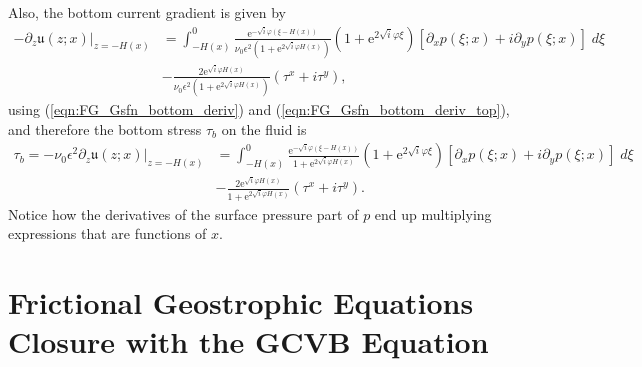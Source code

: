 \documentclass[10pt]{amsart}
\begin{document}
Also, the bottom current gradient is given by
\begin{align}
-\partial_z \left. \mathfrak{u} (z;x) \right|_{z = -H(x)} & =  \int_{-H(x)}^{0} 
 \frac{ \mathrm{e}^{-\sqrt{i} \varphi (\xi - H(x))  } }{ \nu_0 \epsilon^2 \left(1 + \mathrm{e}^{2 \sqrt{i} \varphi H \left(x \right)} \right)}
\left( 1 + \mathrm{e}^{2 \sqrt{i} \varphi \xi}\right) 
 \left[ \partial_x p( \xi; x) + i \partial_y p( \xi; x) \right] \; d \xi \nonumber \\
& - \frac{ 2 \mathrm{e}^{\sqrt{i} \varphi H(x)  } }{ \nu_0 \epsilon^2 \left(1 + \mathrm{e}^{2 \sqrt{i} \varphi H \left(x \right)} \right)}
\left( \tau^x + i \tau^y \right) ,
\end{align}
using (\ref{eqn:FG_Gsfn_bottom_deriv}) and (\ref{eqn:FG_Gsfn_bottom_deriv_top}), and therefore the bottom stress $\tau_b$ on the fluid is
\begin{align}
\tau_b = - \nu_0 \epsilon^2 \partial_z \left. \mathfrak{u} (z;x) \right|_{z = -H(x)} & = \int_{-H(x)}^{0} 
\frac{ \mathrm{e}^{-\sqrt{i} \varphi (\xi - H(x))  } }{ 1 + \mathrm{e}^{2 \sqrt{i} \varphi H \left(x \right)} }
\left( 1 + \mathrm{e}^{2 \sqrt{i} \varphi \xi}\right) 
 \left[ \partial_x p( \xi; x) + i \partial_y p( \xi; x) \right] \; d \xi \nonumber \\
&-\frac{ 2 \mathrm{e}^{\sqrt{i} \varphi H(x)  } }{ 1 + \mathrm{e}^{2 \sqrt{i} \varphi H \left(x \right)} }
 \left( \tau^x + i \tau^y \right) .
 \label{eqn:bottom_stress_expression}
 \end{align}
Notice how the derivatives of the surface pressure part of $p$ end up multiplying expressions that are functions of $x$.

\section{Frictional Geostrophic Equations Closure with the GCVB Equation}
\end{document}
